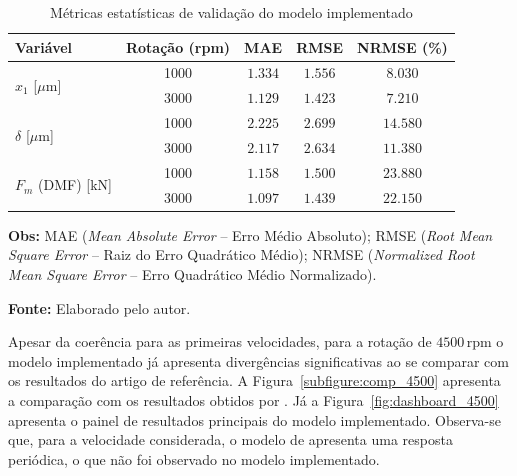 \begin{table}[H]
	\centering
	\setlength{\tabcolsep}{1.5em} 
	
	\begin{threeparttable}
		\caption{Métricas estatísticas de validação do modelo implementado}
		\label{tab:metricas_validacao}
		
		\begin{tabular}{lcccc}
			\hline
			\textbf{Variável} & \textbf{Rotação (rpm)} & \textbf{MAE} & \textbf{RMSE} & \textbf{NRMSE (\%)} \\
			\hline
			\multirow{2}{*}{$x_1$ [$\mu$m]} & 1000  & $1.334$ & $1.556$ & $8.030$ \\
			& 3000  & $1.129$ & $1.423$ & $7.210$ \\
			\hline
			\multirow{2}{*}{$\delta$ [$\mu$m]} & 1000  & $2.225$ & $2.699$ & $14.580$ \\
			& 3000  & $2.117$ & $2.634$ & $11.380$ \\
			\hline
			\multirow{2}{*}{$F_m$ (DMF) [kN]} & 1000 & $1.158$ & $1.500$ & $23.880$ \\
			& 3000  & $1.097$ & $1.439$ & $22.150$ \\
			\hline
		\end{tabular}
		
		\begin{tablenotes}[flushleft]
			\scriptsize
			\item \textbf{Obs:} MAE (\textit{Mean Absolute Error} -- Erro Médio Absoluto); RMSE (\textit{Root Mean Square Error} -- Raiz do Erro Quadrático Médio); NRMSE (\textit{Normalized Root Mean Square Error} -- Erro Quadrático Médio Normalizado).
			\item \textbf{Fonte:} Elaborado pelo autor.
		\end{tablenotes}
		
	\end{threeparttable}
\end{table}

Apesar da coerência para as primeiras velocidades, para a rotação de $4500\,\mathrm{rpm}$ o modelo implementado já apresenta divergências significativas ao se comparar com os resultados do artigo de referência. A Figura~\ref{subfigure:comp_4500} apresenta a comparação com os resultados obtidos por . Já a Figura~\ref{fig:dashboard_4500} apresenta o painel de resultados principais do modelo implementado. Observa-se que, para a velocidade considerada, o modelo de  apresenta uma resposta periódica, o que não foi observado no modelo implementado.

